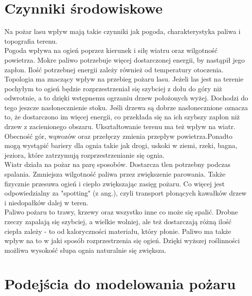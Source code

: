 \documentclass[a4paper, 11pt]{article}
\begin{document}
	\section*{Czynniki środowiskowe}%
	\indent Na pożar lasu wpływ mają takie czynniki jak pogoda, charakterystyka paliwa i topografia terenu.	\\
	\indent
	Pogoda wpływa na ogień poprzez kierunek i siłę wiatru oraz wilgotność powietrza. Mokre paliwo potrzebuje więcej dostarczonej energii, by nastąpił jego zapłon. Ilość potrzebnej energii zależy również od temperatury otoczenia.	\\
	\indent
	Topologia ma znaczący wpływ na przebieg pożaru lasu. Jeżeli las jest na terenie pochyłym to ogień będzie rozprzestrzeniał się szybciej z dołu do góry niż odwrotnie, a to dzięki wstępnemu ogrzaniu drzew położonych wyżej. Dochodzi do tego jeszcze nasłonecznienie stoku. Jeśli drzewa są dobrze nasłonecznione oznacza to, że dostarczono im więcej energii, co przekłada się na ich szybszy zapłon niż drzew z zacienionego obszaru. Ukształtowanie terenu ma też wpływ na wiatr. Obecność gór, wąwozów oraz przełęczy zmienia przepływ powietrza.Ponadto mogą wystąpić bariery dla ognia takie jak drogi, uskoki w ziemi, rzeki, bagna, jeziora, które zatrzymują rozprzestrzenianie się ognia.\\
	\indent
	Wiatr działa na pożar na parę sposobów. Dostarcza tlen potrzebny podczas spalania. Zmniejsza wilgotność paliwa przez zwiększenie parowania. Także fizycznie przesuwa ogień i ciepło zwiększając zasięg pożaru. Co więcej jest odpowiedzialny za "spotting" (z ang.), czyli transport płonących kawałków drzew i niedopałków dalej w teren.\\
	\indent
	Paliwo pożaru to trawy, krzewy oraz wszystko inne co może się spalić. Drobne rzeczy zapalają się szybciej, a wielkie wolniej, ale też dostarczają różną ilość ciepła zależy - to od kaloryczności materiału, który płonie. Paliwo ma także wpływ na to w jaki sposób rozprzestrzenia się ogień. Dzięki wyższej roślinności możliwa wysokość słupa ognia naturalnie się zwiększa.  \\
	
	\section*{Podejścia do modelowania pożaru}
	\indent
	
\end{document}
